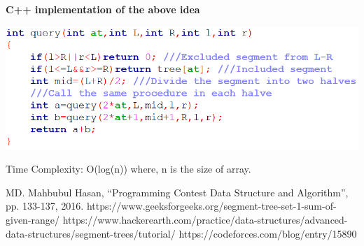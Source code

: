 \documentclass[conference,column]{IEEEtran}
\begin{document}
\textbf{C++ implementation of the above idea}
\begin{center}
\includegraphics[scale=0.60]{4.png}
\end{center}

Time Complexity: O(log(n)) where, n is the size of array.


\begin{thebibliography}{10}
MD. Mahbubul Hasan, “Programming Contest Data Structure and Algorithm”, pp. 133-137, 2016.
https://www.geeksforgeeks.org/segment-tree-set-1-sum-of-given-range/
https://www.hackerearth.com/practice/data-structures/advanced-data-structures/segment-trees/tutorial/
https://codeforces.com/blog/entry/15890
\end{thebibliography}
\end{document}
